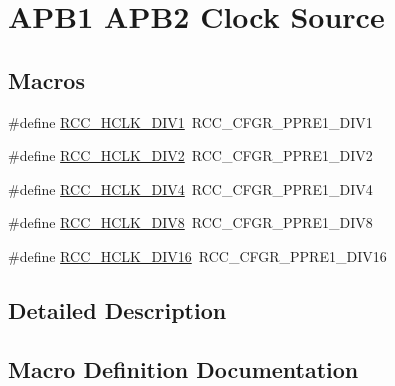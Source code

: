 \hypertarget{group___r_c_c___a_p_b1___a_p_b2___clock___source}{}\section{A\+P\+B1 A\+P\+B2 Clock Source}
\label{group___r_c_c___a_p_b1___a_p_b2___clock___source}
\subsection*{Macros}
\begin{DoxyCompactItemize}
\item 
\#define \hyperlink{group___r_c_c___a_p_b1___a_p_b2___clock___source_ga8e3fcdef0e5d77bb61a52420fe1e9fbc}{R\+C\+C\+\_\+\+H\+C\+L\+K\+\_\+\+D\+I\+V1}~R\+C\+C\+\_\+\+C\+F\+G\+R\+\_\+\+P\+P\+R\+E1\+\_\+\+D\+I\+V1
\item 
\#define \hyperlink{group___r_c_c___a_p_b1___a_p_b2___clock___source_ga4d2ebcf280d85e8449a5fb7b994b5169}{R\+C\+C\+\_\+\+H\+C\+L\+K\+\_\+\+D\+I\+V2}~R\+C\+C\+\_\+\+C\+F\+G\+R\+\_\+\+P\+P\+R\+E1\+\_\+\+D\+I\+V2
\item 
\#define \hyperlink{group___r_c_c___a_p_b1___a_p_b2___clock___source_ga85b5f4fd936e22a3f4df5ed756f6e083}{R\+C\+C\+\_\+\+H\+C\+L\+K\+\_\+\+D\+I\+V4}~R\+C\+C\+\_\+\+C\+F\+G\+R\+\_\+\+P\+P\+R\+E1\+\_\+\+D\+I\+V4
\item 
\#define \hyperlink{group___r_c_c___a_p_b1___a_p_b2___clock___source_gadb18bc60e2c639cb59244bedb54f7bb3}{R\+C\+C\+\_\+\+H\+C\+L\+K\+\_\+\+D\+I\+V8}~R\+C\+C\+\_\+\+C\+F\+G\+R\+\_\+\+P\+P\+R\+E1\+\_\+\+D\+I\+V8
\item 
\#define \hyperlink{group___r_c_c___a_p_b1___a_p_b2___clock___source_ga27ac27d48360121bc2dc68b99dc8845d}{R\+C\+C\+\_\+\+H\+C\+L\+K\+\_\+\+D\+I\+V16}~R\+C\+C\+\_\+\+C\+F\+G\+R\+\_\+\+P\+P\+R\+E1\+\_\+\+D\+I\+V16
\end{DoxyCompactItemize}


\subsection{Detailed Description}


\subsection{Macro Definition Documentation}
\mbox{\label{group___r_c_c___a_p_b1___a_p_b2___clock___source_ga8e3fcdef0e5d77bb61a52420fe1e9fbc}} 
